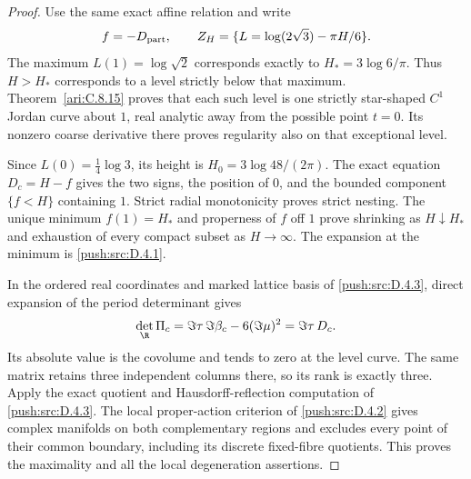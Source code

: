 \begin{proof}

Use the same exact affine relation and write
\[
 f=-D_{\rm part},\qquad
 Z_H=\{L=\log(2\sqrt3)-\pi H/6\}.
\]
The maximum $L(1)=\log\sqrt2$ corresponds exactly to
$H_*=3\log6/\pi$. Thus $H>H_*$ corresponds to a level
strictly below that maximum. Theorem~\ref{ari:C.8.15} proves
that each such level is one strictly star-shaped $C^1$ Jordan
curve about $1$, real analytic away from the possible point
$t=0$. Its nonzero coarse derivative there proves regularity
also on that exceptional level.

Since $L(0)=\tfrac14\log3$, its height is
$H_0=3\log48/(2\pi)$. The exact equation $D_c=H-f$ gives
the two signs, the position of $0$, and the bounded component
$\{f<H\}$ containing $1$. Strict radial monotonicity proves
strict nesting. The unique minimum $f(1)=H_*$ and properness
of $f$ off $1$ prove shrinking as $H\downarrow H_*$ and
exhaustion of every compact subset as $H\to\infty$.
The expansion at the minimum is \ref{push:src:D.4.1}.

In the ordered real coordinates and marked lattice basis of
\ref{push:src:D.4.3}, direct expansion of the period determinant
gives
\[
 \det_{\R}\Pi_c
   =\Im\tau\,\Im\beta_c-6(\Im\mu)^2
   =\Im\tau\,D_c.
\]
Its absolute value is the covolume and tends to zero at the
level curve. The same matrix retains three independent columns
there, so its rank is exactly three. Apply the exact quotient
and Hausdorff-reflection computation of \ref{push:src:D.4.3}.
The local proper-action criterion of \ref{push:src:D.4.2}
gives complex manifolds on both complementary regions and
excludes every point of their common boundary, including its
discrete fixed-fibre quotients. This proves the maximality and
all the local degeneration assertions.

\end{proof}
